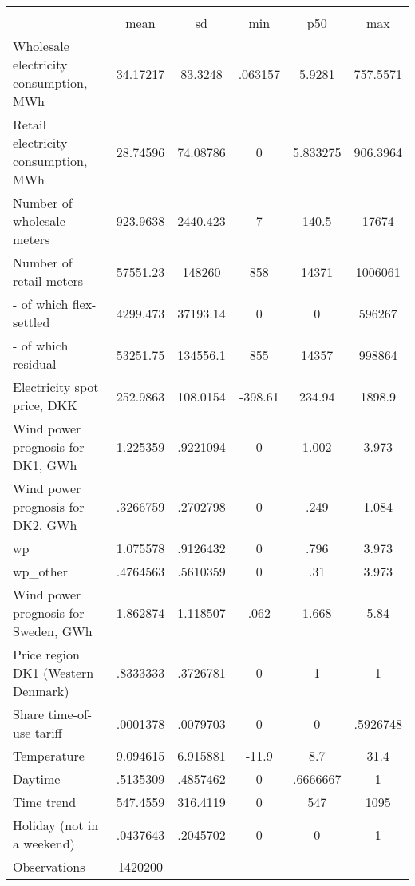\begin{tabular}{l*{1}{ccccc}}
\hline\hline
                    &\multicolumn{5}{c}{}                                            \\
                    &        mean&          sd&         min&         p50&         max\\
\midrule
Wholesale electricity consumption, MWh&    34.17217&     83.3248&     .063157&      5.9281&    757.5571\\
Retail electricity consumption, MWh&    28.74596&    74.08786&           0&    5.833275&    906.3964\\
Number of wholesale meters&    923.9638&    2440.423&           7&       140.5&       17674\\
Number of retail meters&    57551.23&      148260&         858&       14371&     1006061\\
- of which flex-settled&    4299.473&    37193.14&           0&           0&      596267\\
- of which residual &    53251.75&    134556.1&         855&       14357&      998864\\
Electricity spot price, DKK&    252.9863&    108.0154&     -398.61&      234.94&      1898.9\\
Wind power prognosis for DK1, GWh&    1.225359&    .9221094&           0&       1.002&       3.973\\
Wind power prognosis for DK2, GWh&    .3266759&    .2702798&           0&        .249&       1.084\\
wp                  &    1.075578&    .9126432&           0&        .796&       3.973\\
wp\_other            &    .4764563&    .5610359&           0&         .31&       3.973\\
Wind power prognosis for Sweden, GWh&    1.862874&    1.118507&        .062&       1.668&        5.84\\
Price region DK1 (Western Denmark)&    .8333333&    .3726781&           0&           1&           1\\
Share time-of-use tariff&    .0001378&    .0079703&           0&           0&    .5926748\\
Temperature         &    9.094615&    6.915881&       -11.9&         8.7&        31.4\\
Daytime             &    .5135309&    .4857462&           0&    .6666667&           1\\
Time trend          &    547.4559&    316.4119&           0&         547&        1095\\
Holiday (not in a weekend)&    .0437643&    .2045702&           0&           0&           1\\
\midrule
Observations        &     1420200&            &            &            &            \\
\bottomrule\end{tabular}

